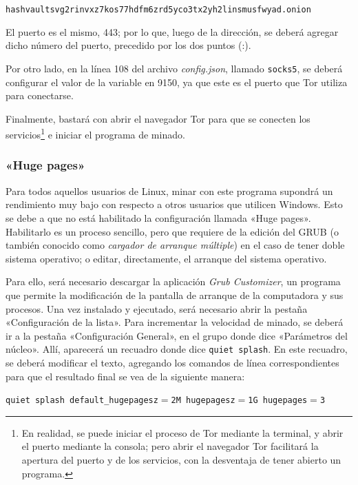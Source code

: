 \documentclass[12pt,a4paper,twoside]{book}
\begin{document}
\begin{small}
\texttt{hashvaultsvg2rinvxz7kos77hdfm6zrd5yco3tx2yh2linsmusfwyad.onion}
\end{small}

El puerto es el mismo, 443; por lo que, luego de la dirección, se deberá agregar dicho número del puerto, precedido por los dos puntos (:).

Por otro lado, en la línea 108 del archivo \textit{config.json}, llamado \texttt{socks5}, se deberá configurar el valor de la variable en 9150, ya que este es el puerto que Tor utiliza para conectarse.

Finalmente, bastará con abrir el navegador Tor para que se conecten los servicios\footnote{En realidad, se puede iniciar el proceso de Tor mediante la terminal, y abrir el puerto mediante la consola; pero abrir el navegador Tor facilitará la apertura del puerto y de los servicios, con la desventaja de tener abierto un programa.} e iniciar el programa de minado.

\subsubsection{«Huge pages»}
Para todos aquellos usuarios de Linux, minar con este programa supondrá un rendimiento muy bajo con respecto a otros usuarios que utilicen Windows. Esto se debe a que no está habilitado la configuración llamada «Huge pages». Habilitarlo es un proceso sencillo, pero que requiere de la edición del GRUB (o también conocido como \textit{cargador de arranque múltiple}) en el caso de tener doble sistema operativo; o editar, directamente, el arranque del sistema operativo.

Para ello, será necesario descargar la aplicación \textit{Grub Customizer}, un programa que permite la modificación de la pantalla de arranque de la computadora y sus procesos. Una vez instalado y ejecutado, será necesario abrir la pestaña «Configuración de la lista». Para incrementar la velocidad de minado, se deberá ir a la pestaña «Configuración General», en el grupo donde dice «Parámetros del núcleo». Allí, aparecerá un recuadro donde dice \texttt{quiet splash}. En este recuadro, se deberá modificar el texto, agregando los comandos de línea correspondientes para que el resultado final se vea de la siguiente manera:

\begin{small}
\texttt{quiet splash default\_hugepagesz\(=\)2M hugepagesz\(=\)1G hugepages\(=\)3}
\end{small}
\end{document}
